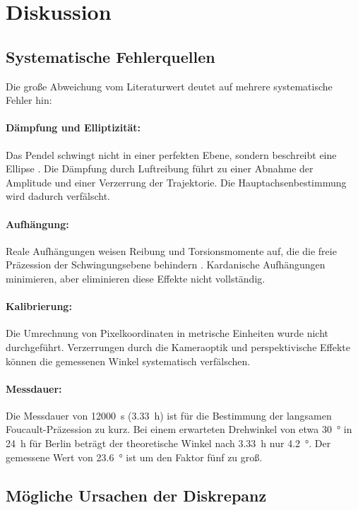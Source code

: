 \documentclass[a4paper,12pt]{article}
\begin{document}
\section{Diskussion}

\subsection{Systematische Fehlerquellen}

Die große Abweichung vom Literaturwert deutet auf mehrere systematische Fehler hin:

\paragraph{Dämpfung und Elliptizität:} Das Pendel schwingt nicht in einer perfekten Ebene, sondern beschreibt eine Ellipse \cite[S.~91]{demtroeder2018}. Die Dämpfung durch Luftreibung führt zu einer Abnahme der Amplitude und einer Verzerrung der Trajektorie. Die Hauptachsenbestimmung wird dadurch verfälscht.

\paragraph{Aufhängung:} Reale Aufhängungen weisen Reibung und Torsionsmomente auf, die die freie Präzession der Schwingungsebene behindern \cite[S.~158]{nolting2023}. Kardanische Aufhängungen minimieren, aber eliminieren diese Effekte nicht vollständig.

\paragraph{Kalibrierung:} Die Umrechnung von Pixelkoordinaten in metrische Einheiten wurde nicht durchgeführt. Verzerrungen durch die Kameraoptik und perspektivische Effekte können die gemessenen Winkel systematisch verfälschen.

\paragraph{Messdauer:} Die Messdauer von \qty{12000}{s} (\qty{3.33}{h}) ist für die Bestimmung der langsamen Foucault-Präzession zu kurz. Bei einem erwarteten Drehwinkel von etwa \qty{30}{\degree} in \qty{24}{h} für Berlin beträgt der theoretische Winkel nach \qty{3.33}{h} nur \qty{4.2}{\degree}. Der gemessene Wert von \qty{23.6}{\degree} ist um den Faktor fünf zu groß.

\subsection{Mögliche Ursachen der Diskrepanz}
\end{document}
